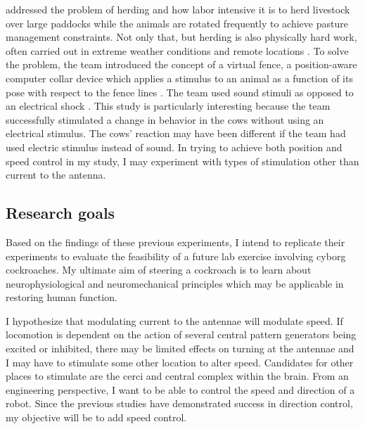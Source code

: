 \citet{Butler2005} addressed the problem of herding and how labor intensive it is to herd livestock over large paddocks while the animals are rotated frequently to achieve pasture management constraints. Not only that, but herding is also physically hard work, often carried out in extreme weather conditions and remote locations \citep{Butler2005}. To solve the problem, the team introduced the concept of a virtual fence, a position-aware computer collar device which applies a stimulus to an animal as a function of its pose with respect to the fence lines \citep{Butler2005}. The team used sound stimuli as opposed to an electrical shock \citep{Butler2005}. This study is particularly interesting because the team successfully stimulated a change in behavior in the cows without using an electrical stimulus. The cows' reaction may have been different if the team had used electric stimulus instead of sound. In trying to achieve both position and speed control in my study, I may experiment with types of stimulation other than current to the antenna.





\subsection{Research goals}
Based on the findings of these previous experiments, I intend to replicate their experiments to evaluate the feasibility of a future lab exercise involving cyborg cockroaches. My ultimate aim of steering a cockroach is to learn about neurophysiological and neuromechanical principles which may be applicable in restoring human function. 

I hypothesize that modulating current to the antennae will modulate speed. If locomotion is dependent on the action of several central pattern generators being excited or inhibited, there may be limited effects on turning at the antennae and I may have to stimulate some other location to alter speed. 
Candidates for other places to stimulate are the cerci and central complex within the brain. From an engineering perspective, I want to be able to control the speed and direction of a robot. Since the previous studies have demonstrated success in direction control, my objective will be to add speed control.








